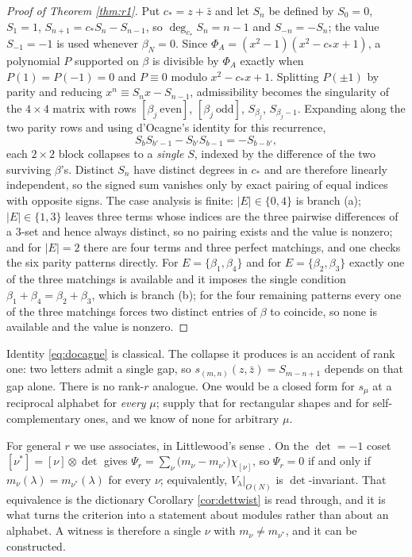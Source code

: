 \documentclass[11pt,reqno]{amsart}
\theoremstyle{plain}
\theoremstyle{definition}
\begin{document}
\begin{proof}[Proof of Theorem \ref{thm:r1}]
Put $c_\ast=z+\bar z$ and let $S_n$ be defined by $S_0=0$, $S_1=1$,
$S_{n+1}=c_\ast S_n-S_{n-1}$, so $\deg_{c_\ast}S_n=n-1$ and $S_{-n}=-S_n$; the value $S_{-1}=-1$ is
used whenever $\beta_N=0$. Since $\Phi_A=(x^2-1)(x^2-c_\ast x+1)$, a polynomial $P$ supported on
$\beta$ is divisible by $\Phi_A$ exactly when $P(1)=P(-1)=0$ and $P\equiv0$ modulo $x^2-c_\ast x+1$.
Splitting $P(\pm1)$ by parity and reducing $x^n\equiv S_nx-S_{n-1}$, admissibility becomes the
singularity of the $4\times4$ matrix with rows $[\beta_j\ \mathrm{even}]$,
$[\beta_j\ \mathrm{odd}]$, $S_{\beta_j}$, $S_{\beta_j-1}$. Expanding along the two parity rows and
using d'Ocagne's identity \cite{Doc} for this recurrence,
\begin{equation}\label{eq:docagne}
S_bS_{b'-1}-S_{b'}S_{b-1}=-S_{b-b'},
\end{equation}
each $2\times2$ block collapses to a \emph{single} $S$, indexed by the difference of the two
surviving $\beta$'s. Distinct $S_n$ have distinct degrees in $c_\ast$ and are therefore linearly
independent, so the signed sum vanishes only by exact pairing of equal indices with opposite signs.
The case analysis is finite: $|E|\in\{0,4\}$ is branch (a); $|E|\in\{1,3\}$ leaves three terms whose
indices are the three pairwise differences of a $3$-set and hence always distinct, so no pairing
exists and the value is nonzero; and for $|E|=2$ there are four terms and three perfect matchings,
and one checks the six parity patterns directly. For $E=\{\beta_1,\beta_4\}$ and for
$E=\{\beta_2,\beta_3\}$ exactly one of the three matchings is available and it imposes the single
condition $\beta_1+\beta_4=\beta_2+\beta_3$, which is branch (b); for the four remaining patterns
every one of the three matchings forces two distinct entries of $\beta$ to coincide, so none is
available and the value is nonzero.
\end{proof}

Identity \eqref{eq:docagne} is classical. The collapse it produces is an accident of rank one: two
letters admit a single gap, so $s_{(m,n)}(z,\bar z)=S_{m-n+1}$ depends on that gap alone. There is no
rank-$r$ analogue. One would be a closed form for $s_\mu$ at a reciprocal alphabet for \emph{every}
$\mu$; \cite{CK09} supply that for rectangular shapes and \cite{AB19} for self-complementary ones,
and we know of none for arbitrary $\mu$.

For general $r$ we use associates, in Littlewood's sense \cite{Lit50}. On the $\det=-1$ coset $[\nu^{*}]=[\nu]\otimes\det$ gives
$\Psi_r=\sum_\nu\big(m_\nu-m_{\nu^{*}}\big)\chi_{[\nu]}$, so $\Psi_r=0$ if and only if
$m_\nu(\lambda)=m_{\nu^{*}}(\lambda)$ for every $\nu$; equivalently, $V_\lambda|_{O(N)}$ is
$\det$-invariant. That equivalence is the dictionary Corollary \ref{cor:dettwist} is read through,
and it is what turns the criterion into a statement about modules rather than about an alphabet. A
witness is therefore a single $\nu$ with $m_\nu\ne m_{\nu^{*}}$, and it can be
constructed.
\end{document}
